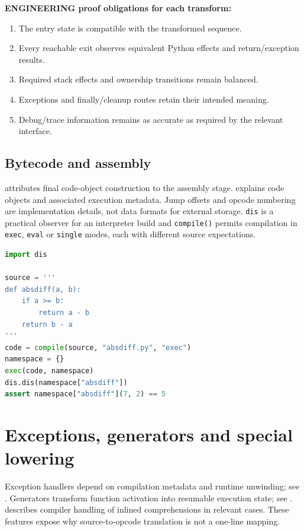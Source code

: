 \documentclass[
  11pt,
]{report}
\newcommand{\passthrough}[1]{#1}
\providecommand{\tightlist}{%
  \setlength{\itemsep}{0pt}\setlength{\parskip}{0pt}}
\begin{document}
\textbf{ENGINEERING proof obligations for each transform:}

\begin{enumerate}
\def\labelenumi{\arabic{enumi}.}
\tightlist
\item
  The entry state is compatible with the transformed sequence.
\item
  Every reachable exit observes equivalent Python effects and
  return/exception results.
\item
  Required stack effects and ownership transitions remain balanced.
\item
  Exceptions and finally/cleanup routes retain their intended meaning.
\item
  Debug/trace information remains as accurate as required by the
  relevant interface.
\end{enumerate}

\section{Bytecode and assembly}\label{bytecode-and-assembly}

 attributes final
code-object construction to the assembly stage.
 explains code
objects and associated execution metadata. Jump offsets and opcode
numbering are implementation details, not data formats for external
storage. \passthrough{\lstinline!dis!} is a practical observer for an
interpreter build and \passthrough{\lstinline!compile()!} permits
compilation in \passthrough{\lstinline!exec!},
\passthrough{\lstinline!eval!} or \passthrough{\lstinline!single!}
modes, each with different source expectations.

\begin{lstlisting}[language=Python]
import dis

source = '''
def absdiff(a, b):
    if a >= b:
        return a - b
    return b - a
'''
code = compile(source, "absdiff.py", "exec")
namespace = {}
exec(code, namespace)
dis.dis(namespace["absdiff"])
assert namespace["absdiff"](7, 2) == 5
\end{lstlisting}

\chapter{Exceptions, generators and special
lowering}\label{exceptions-generators-and-special-lowering}

Exception handlers depend on compilation metadata and runtime unwinding;
see .
Generators transform function activation into resumable execution state;
see .
describes compiler handling of inlined comprehensions in relevant cases.
These features expose why source-to-opcode translation is not a one-line
mapping.
\end{document}
